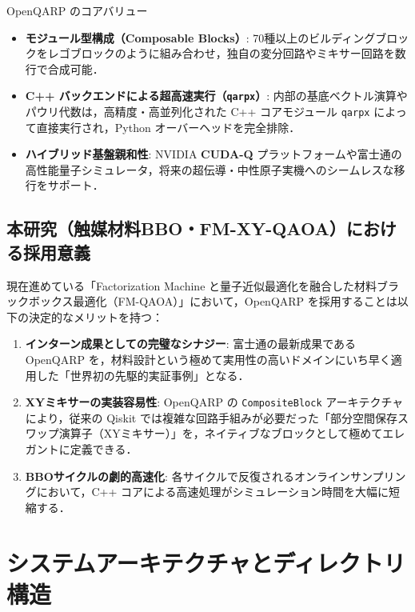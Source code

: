 \documentclass[11pt,a4paper]{ltjsarticle}
\begin{document}
\begin{keybox}{OpenQARP のコアバリュー}
\begin{itemize}\setlength{\itemsep}{1mm}
    \item \textbf{モジュール型構成（Composable Blocks）}: 70種以上のビルディングブロックをレゴブロックのように組み合わせ，独自の変分回路やミキサー回路を数行で合成可能．
    \item \textbf{C++ バックエンドによる超高速実行（\texttt{qarpx}）}: 内部の基底ベクトル演算やパウリ代数は，高精度・高並列化された C++ コアモジュール \texttt{qarpx} によって直接実行され，Python オーバーヘッドを完全排除．
    \item \textbf{ハイブリッド基盤親和性}: NVIDIA \textbf{CUDA-Q} プラットフォームや富士通の高性能量子シミュレータ，将来の超伝導・中性原子実機へのシームレスな移行をサポート．
\end{itemize}
\end{keybox}

\subsection{本研究（触媒材料BBO・FM-XY-QAOA）における採用意義}
現在進めている「Factorization Machine と量子近似最適化を融合した材料ブラックボックス最適化（FM-QAOA）」において，OpenQARP を採用することは以下の決定的なメリットを持つ：
\begin{enumerate}\setlength{\itemsep}{1mm}
    \item \textbf{インターン成果としての完璧なシナジー}: 富士通の最新成果である OpenQARP を，材料設計という極めて実用性の高いドメインにいち早く適用した「世界初の先駆的実証事例」となる．
    \item \textbf{XYミキサーの実装容易性}: OpenQARP の \texttt{CompositeBlock} アーキテクチャにより，従来の Qiskit では複雑な回路手組みが必要だった「部分空間保存スワップ演算子（XYミキサー）」を，ネイティブなブロックとして極めてエレガントに定義できる．
    \item \textbf{BBOサイクルの劇的高速化}: 各サイクルで反復されるオンラインサンプリングにおいて，C++ コアによる高速処理がシミュレーション時間を大幅に短縮する．
\end{enumerate}

\section{システムアーキテクチャとディレクトリ構造}
\end{document}
